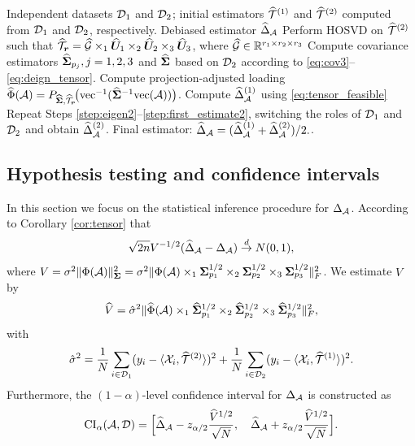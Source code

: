 \documentclass[authoryear,preprint,review,12pt]{elsarticle}
\begin{document}
	\begin{algorithm}
		\caption{Feasible Projection-base One Step Estimate in Tensor Regression}
		\label{alg:tensor_debias}
		\begin{algorithmic}[1]
			\Require Independent datasets $\mathcal{D}_1$ and $\mathcal{D}_2$; initial estimators $\widehat{\mathcal{T}}^{(1)}$ and  $\widehat{\mathcal{T}}^{(2)}$  computed from $\mathcal{D}_1$ and $\mathcal{D}_2$, respectively.
			\Ensure Debiased estimator $\widehat\Delta_{\mathcal{A}}$ 
			\State Perform HOSVD on $\widehat{\mathcal{T}}^{(2)}$ such that $\widehat{\mathcal{T}}_{\boldsymbol r} = \widehat{\mathcal G}\times_1 \widehat{\boldsymbol U}_1 \times_2 \widehat{\boldsymbol U}_2  \times_3 \widehat{\boldsymbol U}_3$, where $\widehat{\mathcal G}\in\mathbb{R}^{r_1\times r_2\times r_3}$ \label{step:eigen2}
			\State Compute covariance estimators $\widehat{\mathbf{ \Sigma}}_{p_j},j=1,2,3$ and $\widehat{\mathbf{ \Sigma}}$ based on $\mathcal{D}_2$ according to \eqref{eq:cov3}--\eqref{eq:deign_tensor}.
			\State Compute projection-adjusted loading $\widehat \Phi(\mathcal{A}) = P_{\widehat{\mathbf{ \Sigma}}, \widehat{\mathcal{T}}_{\boldsymbol r}}\!\bigl(\mathrm{vec}^{-1}(\widehat {\mathbf{ \Sigma}}^{-1}\mathrm{vec}(\mathcal{A}))\bigr)$. 
			\State Compute $\widehat\Delta_{\mathcal{A}}^{(1)}$ using \eqref{eq:tensor_feasible}  \label{step:first_estimate2}
			\State Repeat Steps \ref{step:eigen2}–\ref{step:first_estimate2}, switching the roles of $\mathcal{D}_1$ and $\mathcal{D}_2$ and obtain $\widehat\Delta_{\mathcal{A}}^{(2)}$.
			\State \Return Final estimator: $ \widehat{\Delta}_{\mathcal{A}} =  ( \widehat{\Delta}_{\mathcal{A}}^{(1)} + \widehat{\Delta}_{\mathcal{A}}^{(2)}) /2. $.
		\end{algorithmic}
	\end{algorithm}
	
	
	
	
	\subsection{Hypothesis testing and confidence intervals}
	In this section we focus on the statistical inference procedure for $\Delta_{\mathcal{A}}$. According to
	Corollary \ref{cor:tensor} that
	$$\sqrt{2n}V^{-1/2}( \widehat \Delta_{\mathcal{A}} - \Delta_{\mathcal{A}}) \stackrel{d}{\rightarrow} N(0,1),$$
	where  $V =\sigma^2 \|\Phi(\mathcal{A})\|_{\mathbf{ \Sigma}}^2 =  \sigma^2 \|\Phi(\mathcal{A}) \times_1 \mathbf{ \Sigma}_{p_1}^{1/2}\times_2 \mathbf{ \Sigma}_{p_2}^{1/2}\times_3 \mathbf{ \Sigma}_{p_3}^{1/2}\|_F^2$.
	We estimate $V$ by 
	$$\widehat V  = \hat\sigma^2 \|\widehat\Phi(\mathcal{A}) \times_1 \widehat{\mathbf{ \Sigma}}_{p_1}^{1/2}  \times_2 \widehat{\mathbf{ \Sigma}}_{p_2}^{1/2}  \times_3 \widehat{\mathbf{ \Sigma}}_{p_3}^{1/2}\|_F^2,$$
	with 
	\[\hat\sigma^2 = \frac{1}{N}\sum_{i \in \mathcal{D}_1}(y_i  - \langle\mathcal{X}_i, \widehat{\mathcal{T}}^{(2)}\rangle)^2 +   \frac{1}{N}\sum_{i \in \mathcal{D}_2}(y_i  - \langle\mathcal{X}_i,  \widehat{\mathcal{T}}^{(1)}\rangle)^2.\]
	Furthermore, the $(1-\alpha)$-level confidence interval for $\Delta_{\mathcal{A}}$ is constructed as
	$$\text{CI}_{\alpha}(\mathcal{A}, \mathcal{D}) = \Big[\widehat{\Delta}_{\mathcal{A}}  - z_{\alpha/2}  \frac{\widehat V^{1/2}}{\sqrt{N}}, \quad\widehat{\Delta}_{\mathcal{A}}  + z_{\alpha/2}\frac{ \widehat V^{1/2}}{\sqrt{N}}\Big].$$
	
\end{document}
